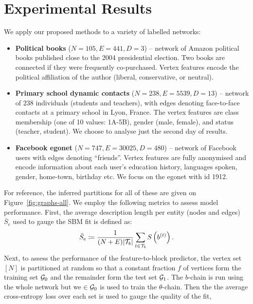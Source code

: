 \section{Experimental Results}
\label{sec:experiments}

We apply our proposed methods to a variety of labelled networks:

\begin{itemize}
	\item \textbf{Political books} \cite{polbooks} ($N=105, E=441, D=3$) -- network of Amazon political books published close to the 2004 presidential election. Two books are connected if they were frequently co-purchased. Vertex features encode the political affiliation of the author (liberal, conservative, or neutral).
	\item \textbf{Primary school dynamic contacts} \cite{schools} ($N=238, E=5539, D=13$) -- network of 238 individuals (students and teachers),
with edges denoting face-to-face contacts at a primary school in Lyon, France. 
The vertex features are class membership (one of 10 values: 1A-5B), gender (male, female), and status (teacher, student). We choose to analyse just the second day of results.
	\item \textbf{Facebook egonet} \cite{fb-snap} ($N=747, E=30025, D=480$) -- network of Facebook users with edges denoting ``friends''.
Vertex features are fully anonymised and encode information about each user's education history, languages spoken, gender, home-town, birthday etc. We focus on the egonet with id 1912.
\end{itemize}
%
For reference, the inferred partitions for all of these are given on Figure~\ref{fig:graphs-all}.
We employ the following metrics to assess model performance. 
First, the average
description length per entity (nodes and edges) 
$\bar{S}_e$ 
used to gauge the SBM fit is defined as:
%
\begin{equation}
	\bar{S}_e \coloneqq \frac{1}{(N+E) |\mathcal{T}_b|} \sum_{t\in \mathcal{T}_b} S \left( b^{(t)} \right).
	\label{eqn:mean-dl}
\end{equation}
%
Next, to assess the performance of the feature-to-block predictor, 
the vertex set $[N]$ 
is partitioned at random so that 
a constant fraction $f$ of vertices form the training set $\mathcal{G}_0$ and 
the remainder form the test set $\mathcal{G}_1$.
The $b$-chain is run using the whole network but we $\in \mathcal{G}_0$ is 
used to train the $\theta$-chain. 
Then the  the average cross-entropy loss 
over each set is used to gauge the quality of the fit,
